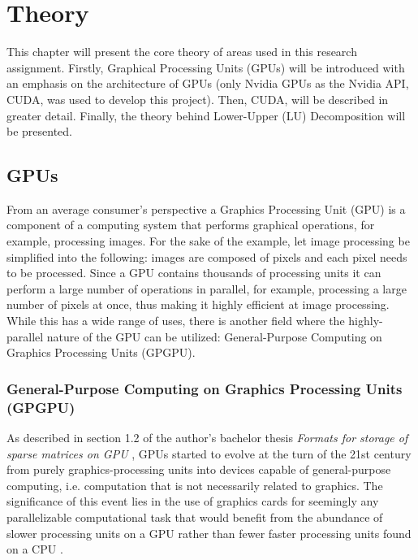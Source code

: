 
\chapter{Theory \TO}
This chapter will present the core theory of areas used in this research assignment. Firstly, Graphical Processing Units (GPUs) will be introduced with an emphasis on the architecture of GPUs (only Nvidia GPUs as the Nvidia API, CUDA, was used to develop this project). Then, CUDA, will be described in greater detail. Finally, the theory behind Lower-Upper (LU) Decomposition will be presented.

\section{GPUs \TO}
From an average consumer's perspective a Graphics Processing Unit (GPU) is a component of a computing system that performs graphical operations, for example, processing images. For the sake of the example, let image processing be simplified into the following: images are composed of pixels and each pixel needs to be processed. Since a GPU contains thousands of processing units it can perform a large number of operations in parallel, for example, processing a large number of pixels at once, thus making it highly efficient at image processing. While this has a wide range of uses, there is another field where the highly-parallel nature of the GPU can be utilized: General-Purpose Computing on Graphics Processing Units (GPGPU).

\subsection{General-Purpose Computing on Graphics Processing Units (GPGPU) \TO}
As described in section 1.2 of the author's bachelor thesis \textit{Formats for storage of sparse matrices on GPU} \cite{Cejka2020}, GPUs started to evolve at the turn of the 21st century from purely graphics-processing units into devices capable of general-purpose computing, i.e. computation that is not necessarily related to graphics. The significance of this event lies in the use of graphics cards for seemingly any parallelizable computational task that would benefit from the abundance of slower processing units on a GPU rather than fewer faster processing units found on a CPU \cite{NVIDIAMay2022}.

